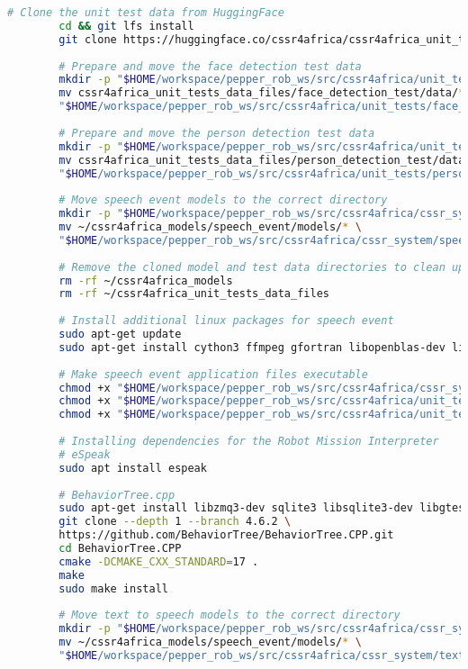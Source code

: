 \documentclass{CSSRforAfrica}
\begin{document}
{\begin{lstlisting}[style=withoutNumbering, language=bash]
		# Clone the unit test data from HuggingFace
		cd && git lfs install
		git clone https://huggingface.co/cssr4africa/cssr4africa_unit_tests_data_files
		
		# Prepare and move the face detection test data
		mkdir -p "$HOME/workspace/pepper_rob_ws/src/cssr4africa/unit_tests/face_detection_test/data"
		mv cssr4africa_unit_tests_data_files/face_detection_test/data/* \
		"$HOME/workspace/pepper_rob_ws/src/cssr4africa/unit_tests/face_detection_test/data/"
		
		# Prepare and move the person detection test data
		mkdir -p "$HOME/workspace/pepper_rob_ws/src/cssr4africa/unit_tests/person_detection_test/data"
		mv cssr4africa_unit_tests_data_files/person_detection_test/data/* \
		"$HOME/workspace/pepper_rob_ws/src/cssr4africa/unit_tests/person_detection_test/data/"
		
		# Move speech event models to the correct directory
		mkdir -p "$HOME/workspace/pepper_rob_ws/src/cssr4africa/cssr_system/speech_event/models"
		mv ~/cssr4africa_models/speech_event/models/* \
		"$HOME/workspace/pepper_rob_ws/src/cssr4africa/cssr_system/speech_event/models"
		
		# Remove the cloned model and test data directories to clean up
		rm -rf ~/cssr4africa_models
		rm -rf ~/cssr4africa_unit_tests_data_files
		
		# Install additional linux packages for speech event
		sudo apt-get update
		sudo apt-get install cython3 ffmpeg gfortran libopenblas-dev libopenblas64-dev patchelf pkg-config portaudio19-dev python3-testresources python3-tk python3-typing-extensions sox
		
		# Make speech event application files executable
		chmod +x "$HOME/workspace/pepper_rob_ws/src/cssr4africa/cssr_system/speech_event/src/speech_event_application.py"
		chmod +x "$HOME/workspace/pepper_rob_ws/src/cssr4africa/unit_tests/speech_event_test/src/speech_event_test_application.py"
		chmod +x "$HOME/workspace/pepper_rob_ws/src/cssr4africa/unit_tests/speech_event_test/src/speech_event_driver.py"
		
		# Installing dependencies for the Robot Mission Interpreter
		# eSpeak
		sudo apt install espeak
		
		# BehaviorTree.cpp
		sudo apt-get install libzmq3-dev sqlite3 libsqlite3-dev libgtest-dev
		git clone --depth 1 --branch 4.6.2 \
		https://github.com/BehaviorTree/BehaviorTree.CPP.git
		cd BehaviorTree.CPP
		cmake -DCMAKE_CXX_STANDARD=17 .
		make
		sudo make install
		
		# Move text to speech models to the correct directory
		mkdir -p "$HOME/workspace/pepper_rob_ws/src/cssr4africa/cssr_system/text_to_speech/model"
		mv ~/cssr4africa_models/speech_event/models/* \
		"$HOME/workspace/pepper_rob_ws/src/cssr4africa/cssr_system/text_to_speech/model"
		

\end{lstlisting}}
\end{document}
